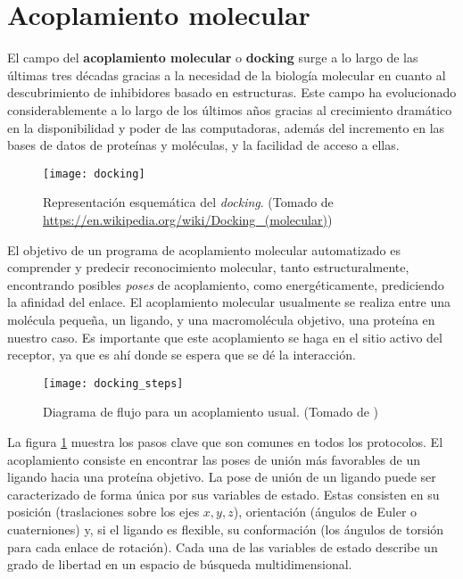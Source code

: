 \section{Acoplamiento molecular}
El campo del \textbf{acoplamiento molecular} o
\textbf{docking} surge a lo largo de las últimas tres décadas gracias a la
necesidad de la biología molecular en cuanto al descubrimiento de
inhibidores basado en estructuras. Este campo ha evolucionado
considerablemente a lo largo de los últimos años gracias al
crecimiento dramático en la disponibilidad y poder de las
computadoras, además del incremento en las bases de datos de proteínas
y moléculas, y la facilidad de acceso a ellas.\cite{kukol}

\begin{figure}[H]
  \texttt{[image: docking]} \centering
  \caption{Representación esquemática del \textit{docking}.  (Tomado de
    \url{https://en.wikipedia.org/wiki/Docking_(molecular)})}
\end{figure}

El objetivo de un programa de acoplamiento molecular automatizado es
comprender y predecir reconocimiento molecular, tanto
estructuralmente, encontrando posibles \textit{poses} de acoplamiento,
como energéticamente, prediciendo la afinidad del enlace. El
acoplamiento molecular usualmente se realiza entre una molécula
pequeña, un ligando, y una macromolécula objetivo, una proteína en
nuestro caso. Es importante que este acoplamiento se haga en el sitio
activo del receptor, ya que es ahí donde se espera que se dé la
interacción.

\begin{center}
\begin{figure}[H]
  \texttt{[image: docking\_steps]}
  \caption{Diagrama de flujo para un acoplamiento usual.  (Tomado de
    \cite{kukol})}
  \label{fig:docking_flowchart}
\end{figure}
\end{center}

La figura \ref{fig:docking_flowchart} muestra los pasos clave que son
comunes en todos los protocolos. El acoplamiento consiste en encontrar
las poses de unión más favorables de un ligando hacia una proteína
objetivo. La pose de unión de un ligando puede ser caracterizado de
forma única por sus variables de estado. Estas consisten en su
posición (traslaciones sobre los ejes $x, y, z$), orientación (ángulos
de Euler o cuaterniones) y, si el ligando es flexible, su conformación
(los ángulos de torsión para cada enlace de rotación). Cada una de las
variables de estado describe un grado de libertad en un espacio de
búsqueda multidimensional.

